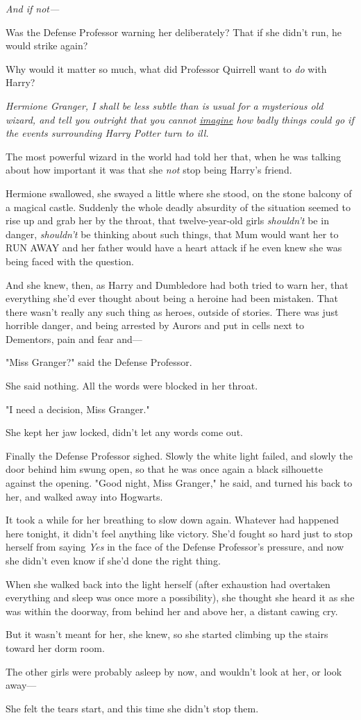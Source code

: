 \emph{And if not---}

Was the Defense Professor warning her deliberately? That if she didn't run, he 
would strike again?

Why would it matter so much, what did Professor Quirrell want to \emph{do} with 
Harry?

\emph{Hermione Granger, I shall be less subtle than is usual for a mysterious 
old wizard, and tell you outright that you cannot \underline{imagine} how badly 
things could go if the events surrounding Harry Potter turn to ill.}

The most powerful wizard in the world had told her that, when he was talking 
about how important it was that she \emph{not} stop being Harry's friend.

Hermione swallowed, she swayed a little where she stood, on the stone balcony 
of a magical castle. Suddenly the whole deadly absurdity of the situation 
seemed to rise up and grab her by the throat, that twelve-year-old girls 
\emph{shouldn't} be in danger, \emph{shouldn't} be thinking about such things, 
that Mum would want her to RUN AWAY and her father would have a heart attack if 
he even knew she was being faced with the question.

And she knew, then, as Harry and Dumbledore had both tried to warn her, that 
everything she'd ever thought about being a heroine had been mistaken. That 
there wasn't really any such thing as heroes, outside of stories. There was 
just horrible danger, and being arrested by Aurors and put in cells next to 
Dementors, pain and fear and---

"Miss Granger?" said the Defense Professor.

She said nothing. All the words were blocked in her throat.

"I need a decision, Miss Granger."

She kept her jaw locked, didn't let any words come out.

Finally the Defense Professor sighed. Slowly the white light failed, and slowly 
the door behind him swung open, so that he was once again a black silhouette 
against the opening. "Good night, Miss Granger," he said, and turned his back 
to her, and walked away into Hogwarts.

It took a while for her breathing to slow down again. Whatever had happened 
here tonight, it didn't feel anything like victory. She'd fought so hard just 
to stop herself from saying \emph{Yes} in the face of the Defense Professor's 
pressure, and now she didn't even know if she'd done the right thing.

When she walked back into the light herself (after exhaustion had overtaken 
everything and sleep was once more a possibility), she thought she heard it as 
she was within the doorway, from behind her and above her, a distant cawing cry.

But it wasn't meant for her, she knew, so she started climbing up the stairs 
toward her dorm room.

The other girls were probably asleep by now, and wouldn't look at her, or look 
away---

She felt the tears start, and this time she didn't stop them.